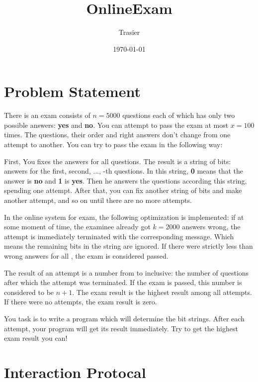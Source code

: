 \documentclass[hyperref,UTF8]{ctexart}
\theoremstyle{definition}
\theoremstyle{remark}
\numberwithin{equation}{subsection}
\newcommand{\Emph}{\textbf}
\begin{document}
\title{\Huge OnlineExam}
\vspace{2cm}
\author{\Large Trasier}
\date{\today}
\maketitle

\section{Problem Statement}
\label{sec:problem_statement}
	
	There is an exam consists of $n = 5000$ questions each of which has only two possible answers: \Emph{yes} and \Emph{no}.
	You can attempt to pass the exam at most $x = 100$ times.
	The questions, their order and right answers don't change from one attempt to another.
	You can try to pass the exam in the following way:
	
	First, You fixes the answers for all questions.
	The result is a string of  bits: answers for the first, second, ..., -th questions.
	In this string, \Emph{0} means that the answer is \Emph{no} and \Emph{1} is \Emph{yes}.
	Then he answers the questions according this string, spending one attempt.
	After that, you can fix another string of  bits and make another attempt, and so on until there are no more attempts.
	
	In the online system for exam, the following optimization is implemented:
	if at some moment of time, the examinee already got $k = 2000$ answers wrong, the attempt is immediately terminated with the corresponding message.
	Which means the remaining bits in the string are ignored.
	If there were strictly less than  wrong answers for all , the exam is considered passed.
	
	The result of an attempt is a number from  to  inclusive: the number of questions after which the attempt was terminated.
	If the exam is passed, this number is considered to be $n + 1$.
	The exam result is the highest result among all attempts.
	If there were no attempts, the exam result is zero.
	
	You task is to write a program which will determine the bit strings.
	After each attempt, your program will get its result immediately.
	Try to get the highest exam result you can!
	

\section{Interaction Protocal}
	
\end{document}
